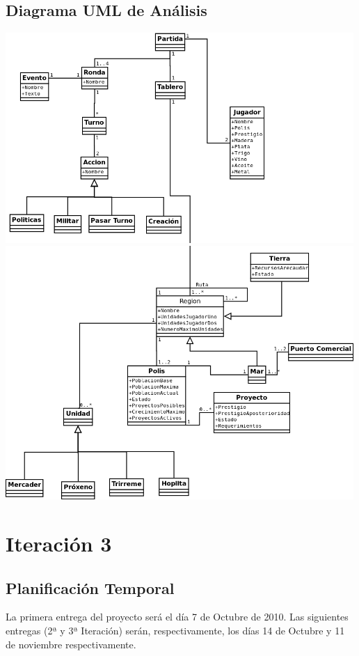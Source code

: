 \documentclass[11 pt]{book}
\begin{document}
	\section{Diagrama UML de Análisis}
		\begin{center}
			\includegraphics[width=500px]{analysis-uml/iteration2/part1.png}
			\includegraphics[width=500px]{analysis-uml/iteration2/part2.png}
		\end{center}
		
\chapter{Iteración 3}
	\section{Planificación Temporal}
		La primera entrega del proyecto será el día 7 de Octubre de 2010. Las siguientes entregas (2ª y 3ª Iteración) serán, respectivamente, los días 14 de Octubre y 11 de noviembre respectivamente.
\end{document}
